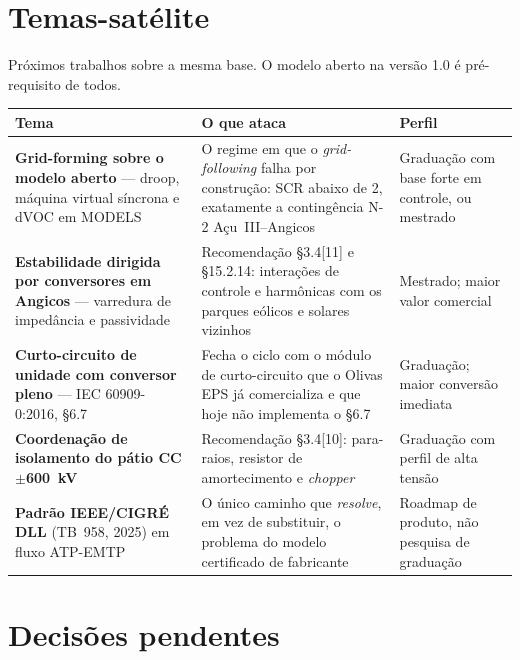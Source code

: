 \documentclass[12pt,a4paper]{article}
\begin{document}
\section{Temas-satélite}

Próximos trabalhos sobre a mesma base. O modelo aberto na versão 1.0 é pré-requisito de todos.

\begin{center}
\small
\begin{tabularx}{\textwidth}{@{}p{4.6cm}Xp{2.7cm}@{}}
\toprule
\textbf{Tema} & \textbf{O que ataca} & \textbf{Perfil} \\
\midrule
\textbf{Grid-forming sobre o modelo aberto} --- droop, máquina virtual síncrona e dVOC em MODELS &
O regime em que o \emph{grid-following} falha por construção: SCR abaixo de 2, exatamente a
contingência N-2 Açu~III--Angicos &
Graduação com base forte em controle, ou mestrado \\
\textbf{Estabilidade dirigida por conversores em Angicos} --- varredura de impedância e passividade &
Recomendação \S3.4[11] e \S15.2.14: interações de controle e harmônicas com os parques eólicos e
solares vizinhos &
Mestrado; maior valor comercial \\
\textbf{Curto-circuito de unidade com conversor pleno} --- IEC 60909-0:2016, \S6.7 &
Fecha o ciclo com o módulo de curto-circuito que o Olivas EPS já comercializa e que hoje não
implementa o \S6.7 &
Graduação; maior conversão imediata \\
\textbf{Coordenação de isolamento do pátio CC $\pm$600~kV} &
Recomendação \S3.4[10]: para-raios, resistor de amortecimento e \emph{chopper} &
Graduação com perfil de alta tensão \\
\textbf{Padrão IEEE/CIGRÉ DLL} (TB~958, 2025) em fluxo ATP-EMTP &
O único caminho que \emph{resolve}, em vez de substituir, o problema do modelo certificado de
fabricante &
Roadmap de produto, não pesquisa de graduação \\
\bottomrule
\end{tabularx}
\end{center}

\section{Decisões pendentes}
\end{document}
